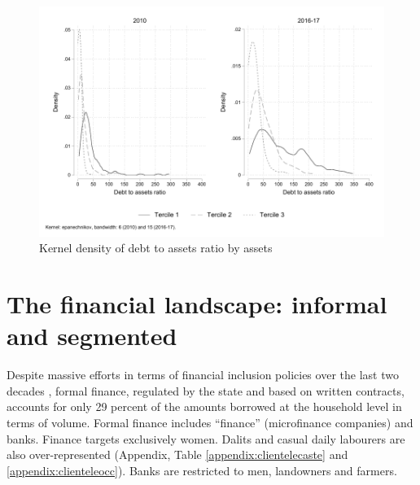 \documentclass[a4paper, 11pt, onecolumn]{article}
\begin{document}
\begin{figure}[h!]
\center
\includegraphics[width=12cm]{DAR_tercile.pdf}
\caption{Kernel density of debt to assets ratio by assets}
\label{kernel:DARassets}
\end{figure}















\section{The financial landscape: informal and segmented}
\label{section:finlandscape}

Despite massive efforts in terms of financial inclusion policies over the last two decades \citep{Nair2016, Kar2018}, formal finance, regulated by the state and based on written contracts, accounts for only 29 percent of the amounts borrowed at the household level in terms of volume. 
Formal finance includes ``finance'' (microfinance companies) and banks. 
Finance targets exclusively women. 
Dalits and casual daily labourers are also over-represented (Appendix, Table \ref{appendix:clientelecaste} and \ref{appendix:clienteleocc}). 
Banks are restricted to men, landowners and farmers. 
\end{document}
